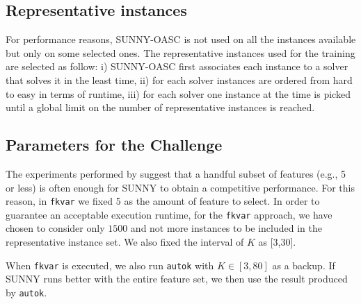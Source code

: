 \documentclass[tablecaption=bottom,wcp]{jmlr} %
\newcommand{\TODO}[1]{\textcolor{red}{#1}}
\begin{document}
\subsection{Representative instances}
For performance reasons, SUNNY-OASC is not used on all the instances available 
but only on some selected ones.
The representative instances used for the training are selected as follow: i) 
SUNNY-OASC first associates each instance to a solver that solves it in the 
least time, ii) for each solver instances are ordered from hard to easy in terms 
of runtime, iii) for each solver one instance at the time is picked until a 
global limit on the number of representative instances is reached.

\subsection{Parameters for the Challenge}
The experiments performed by \cite{ictai_paper} suggest that a handful subset 
of features (e.g., 5 or less) is often enough for SUNNY to obtain a 
competitive performance. For this reason, in \texttt{fkvar} we fixed 
5 as the amount of feature to select. In order to guarantee an acceptable 
execution runtime, for the \texttt{fkvar} approach, we have chosen to 
consider only $1500$ and not more instances to be included in the 
representative instance set. We also fixed the interval of $K$ as [3,30]. 



When \texttt{fkvar} is executed, we also run 
\texttt{autok} with $K \in [3,80]$ as a backup. If SUNNY runs better with the 
entire feature set, we then use the result produced by \texttt{autok}.
\end{document}
